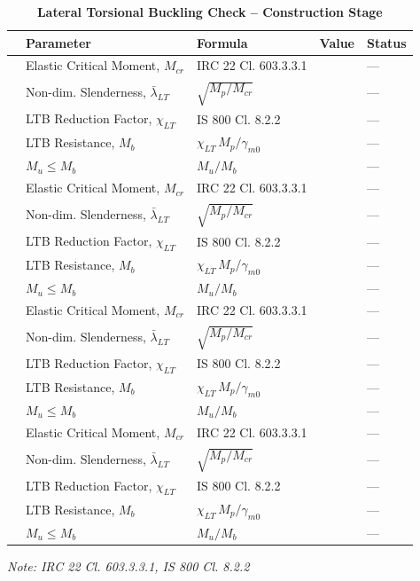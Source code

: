 \documentclass[12pt,a4paper]{report}
\numberwithin{table}{chapter}
\numberwithin{figure}{chapter}
\begin{document}
\vspace{1em}
\begin{longtable}{|C{2.5cm}|C{3.5cm}|C{3.5cm}|>{\centering\arraybackslash}p{4.2cm}|C{1.8cm}|}
\caption{\textbf{Lateral Torsional Buckling Check -- Construction Stage}}
\hline
\textbf{} & \textbf{Parameter} & \textbf{Formula} & \textbf{Value} & \textbf{Status} \\[6pt]
\hline
{} & Elastic Critical Moment, $M_{cr}$ & IRC 22 Cl. 603.3.3.1 &  & --- \\[6pt]
 & Non-dim. Slenderness, $\bar{\lambda}_{LT}$ & $\sqrt{M_p / M_{cr}}$ &  & --- \\[6pt]
 & LTB Reduction Factor, $\chi_{LT}$ & IS 800 Cl. 8.2.2 &  & --- \\[6pt]
 & LTB Resistance, $M_b$ & $\chi_{LT}\,M_p / \gamma_{m0}$ &  & --- \\[6pt]
 & $M_u \leq M_b$ & $M_u / M_b$ &  & --- \\[6pt]
\hline
{} & Elastic Critical Moment, $M_{cr}$ & IRC 22 Cl. 603.3.3.1 &  & --- \\[6pt]
 & Non-dim. Slenderness, $\bar{\lambda}_{LT}$ & $\sqrt{M_p / M_{cr}}$ &  & --- \\[6pt]
 & LTB Reduction Factor, $\chi_{LT}$ & IS 800 Cl. 8.2.2 &  & --- \\[6pt]
 & LTB Resistance, $M_b$ & $\chi_{LT}\,M_p / \gamma_{m0}$ &  & --- \\[6pt]
 & $M_u \leq M_b$ & $M_u / M_b$ &  & --- \\[6pt]
\hline
{} & Elastic Critical Moment, $M_{cr}$ & IRC 22 Cl. 603.3.3.1 &  & --- \\[6pt]
 & Non-dim. Slenderness, $\bar{\lambda}_{LT}$ & $\sqrt{M_p / M_{cr}}$ &  & --- \\[6pt]
 & LTB Reduction Factor, $\chi_{LT}$ & IS 800 Cl. 8.2.2 &  & --- \\[6pt]
 & LTB Resistance, $M_b$ & $\chi_{LT}\,M_p / \gamma_{m0}$ &  & --- \\[6pt]
 & $M_u \leq M_b$ & $M_u / M_b$ &  & --- \\[6pt]
\hline
{} & Elastic Critical Moment, $M_{cr}$ & IRC 22 Cl. 603.3.3.1 &  & --- \\[6pt]
 & Non-dim. Slenderness, $\bar{\lambda}_{LT}$ & $\sqrt{M_p / M_{cr}}$ &  & --- \\[6pt]
 & LTB Reduction Factor, $\chi_{LT}$ & IS 800 Cl. 8.2.2 &  & --- \\[6pt]
 & LTB Resistance, $M_b$ & $\chi_{LT}\,M_p / \gamma_{m0}$ &  & --- \\[6pt]
 & $M_u \leq M_b$ & $M_u / M_b$ &  & --- \\[6pt]
\hline
\end{longtable}
\noindent\textit{Note: IRC 22 Cl. 603.3.3.1, IS 800 Cl. 8.2.2}
\end{document}
